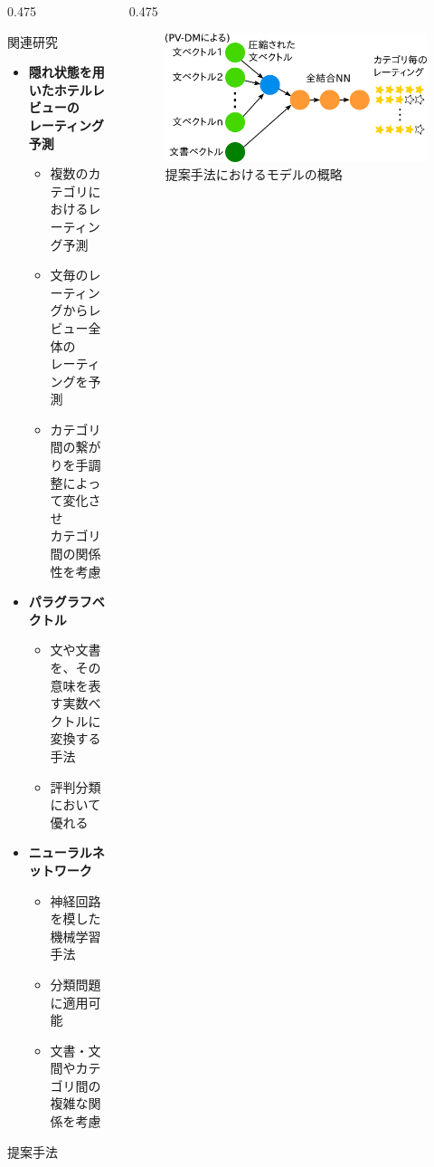 \documentclass[unicode,10pt]{beamer}
\newcommand{\itemtitle}[1]{\textbf{#1}\\}
\newcommand{\columnsize}{0.475\textwidth}
\begin{document}
\begin{frame}
\begin{columns}[onlytextwidth,t]
\begin{column}{\columnsize}
  \begin{block}{関連研究}
    \begin{itemize}
      \item \itemtitle{隠れ状態を用いたホテルレビューの\\
                       レーティング予測\cite{fujitani15}}
        \begin{itemize}
          \item 複数のカテゴリにおけるレーティング予測
          \item 文毎のレーティングからレビュー全体の \\
                レーティングを予測
          \item カテゴリ間の繋がりを手調整によって変化させ \\
                カテゴリ間の関係性を考慮
        \end{itemize}
      \item \itemtitle{パラグラフベクトル\cite{quoc14}}
        \begin{itemize}
          \item 文や文書を、その意味を表す実数ベクトルに \\
                変換する手法
          \item 評判分類において優れる
        \end{itemize}
      \item \itemtitle{ニューラルネットワーク}
        \begin{itemize}
          \item 神経回路を模した機械学習手法
          \item 分類問題に適用可能
          \item 文書・文間やカテゴリ間の複雑な関係を考慮
        \end{itemize}
    \end{itemize}
  \end{block}

  \begin{block}{提案手法}
  \end{block}
\end{column}

\begin{column}{\columnsize}
  \begin{figure}
    \includegraphics[width=\linewidth]{fig/model.png}
    \caption{提案手法におけるモデルの概略}
  \end{figure}


\end{column}
\end{columns}
\end{frame}
\end{document}
